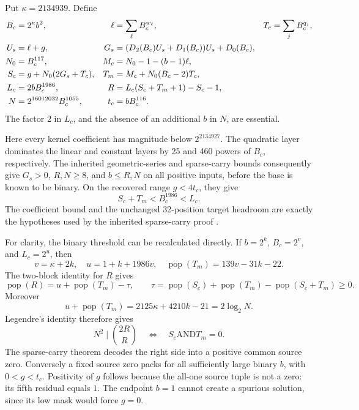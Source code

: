 Put \(\kappa=2134939\). Define
\begin{align}
 B_c&=2^\kappa b^2,&
 \ell&=\sum_\ell B_c^{w_\ell},&
 T_c&=\sum_j B_c^{q_j},\notag\\
 U_s&=\ell+g,&
 G_s&=(D_2(B_c)U_s+D_1(B_c))U_s+D_0(B_c),\notag\\
 N_0&=B_c^{117},&
 M_c&=N_0-1-(b-1)\ell,\notag\\
 S_c&=g+N_0(2G_s+T_c),&
 T_m&=M_c+N_0(B_c-2)T_c,\notag\\
 L_c&=2bB_c^{1986},&
 R&=L_c(S_c+T_m+1)-S_c-1,\notag\\
 N&=2^{16012032}B_c^{1055},&
 t_c&=bB_c^{116}. \label{eq:h1868-prefix}
\end{align}
The factor \(2\) in \(L_c\), and the absence of an additional \(b\) in
\(N\), are essential.

Here every kernel coefficient has magnitude below \(2^{2134927}\).
The quadratic layer dominates the linear and constant layers by 25 and
460 powers of \(B_c\), respectively. The inherited geometric-series and
sparse-carry bounds consequently give \(G_s>0\), \(R,N\ge8\), and
\(b\le R,N\) on all positive inputs, before the base is known to be binary.
On the recovered range \(g<4t_c\), they give
\[
 S_c+T_m<B_c^{1986}<L_c.
 \label{eq:h1868-range}
\]
The coefficient bound and the unchanged 32-position target headroom are
exactly the hypotheses used by the inherited sparse-carry proof
\cite{round11,source71}.

For clarity, the binary threshold can be recalculated directly.
If \(b=2^k\), \(B_c=2^v\), and \(L_c=2^u\), then
\[
 v=\kappa+2k,\quad u=1+k+1986v,\quad
 \operatorname{pop}(T_m)=139v-31k-22.
\]
The two-block identity for \(R\) gives
\[
 \operatorname{pop}(R)=u+\operatorname{pop}(T_m)-\tau,\qquad
 \tau=\operatorname{pop}(S_c)+\operatorname{pop}(T_m)
       -\operatorname{pop}(S_c+T_m)\ge0.
\]
Moreover
\[
 u+\operatorname{pop}(T_m)=2125\kappa+4210k-21=2\log_2N.
\]
Legendre's identity therefore gives
\begin{equation}
 N^2\mid \binom{2R}{R}
 \quad\Longleftrightarrow\quad S_c\mathbin{\mathrm{AND}}T_m=0.
 \label{eq:h1868-calibration}
\end{equation}
The sparse-carry theorem decodes the right side into a positive common
source zero. Conversely a fixed source zero packs for all sufficiently
large binary \(b\), with \(0<g<t_c\). Positivity of \(g\) follows because
the all-one source tuple is not a zero: its fifth residual equals \(1\).
The endpoint \(b=1\) cannot create a spurious solution, since its low mask
would force \(g=0\).

